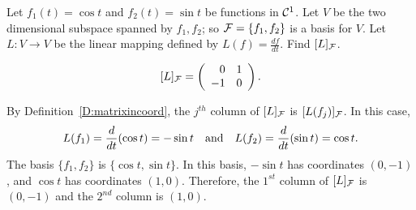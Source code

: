 \documentclass{ximera}
\begin{document}
\begin{exercise} \label{c7.3.2}
Let $f_1(t)=\cos t$ and $f_2(t)=\sin t$ be functions in ${\cal C}^1$.
Let $V$ be the two dimensional subspace spanned by $f_1,f_2$; so
${\cal F}=\{f_1,f_2\}$ is a basis for $V$.  Let $L:V\to V$ be the
linear mapping defined by $L(f)=\frac{df}{dt}$.  Find $[L]_{\cal F}$.

\begin{solution}

\ans \[ [L]_{\cal F} = \left(\begin{array}{rr} 0 & 1\\ -1 &0\end{array}\right). \]

\soln By Definition~\ref{D:matrixincoord}, the $j^{th}$
column of $[L]_{\cal F}$ is $[L(f_j)]_{\cal F}$.  In this case,
\[
L(f_1) = \frac{d}{dt}(\cos t) = -\sin t \quad\mbox{and}\quad
L(f_2) = \frac{d}{dt}(\sin t) = \cos t.
\]
The basis $\{f_1,f_2\}$ is $\{\cos t,\sin t\}$.  In this basis,
$-\sin t$ has coordinates $(0,-1)$, and $\cos t$ has coordinates
$(1,0)$.  Therefore, the $1^{st}$ column of $[L]_{\cal F}$ is
$(0,-1)$ and the $2^{nd}$ column is $(1,0)$.

\end{solution}
\end{exercise}
\end{document}
